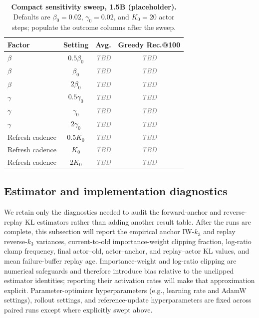 \documentclass{article}
\newcommand{\TBD}{\textcolor{gray}{\textit{TBD}}}
\begin{document}
\begin{table}[h]
\centering
\small
\begin{tabular}{lccc}
\toprule
Factor & Setting & Avg. & Greedy Rec.@100\\
\midrule
$\beta$ & $0.5\beta_0$ & \TBD & \TBD\\
$\beta$ & $\beta_0$ & \TBD & \TBD\\
$\beta$ & $2\beta_0$ & \TBD & \TBD\\
\midrule
$\gamma$ & $0.5\gamma_0$ & \TBD & \TBD\\
$\gamma$ & $\gamma_0$ & \TBD & \TBD\\
$\gamma$ & $2\gamma_0$ & \TBD & \TBD\\
\midrule
Refresh cadence & $0.5K_0$ & \TBD & \TBD\\
Refresh cadence & $K_0$ & \TBD & \TBD\\
Refresh cadence & $2K_0$ & \TBD & \TBD\\
\bottomrule
\end{tabular}
\caption{\textbf{Compact sensitivity sweep, 1.5B (placeholder).} Defaults are $\beta_0=0.02$, $\gamma_0=0.02$, and $K_0=20$ actor steps; populate the outcome columns after the sweep.}
\label{tab:sensitivity}
\end{table}

\subsection{Estimator and implementation diagnostics}
We retain only the diagnostics needed to audit the forward-anchor and reverse-replay KL estimators rather than adding another result table. After the runs are complete, this subsection will report the empirical anchor IW-$k_3$ and replay reverse-$k_3$ variances, current-to-old importance-weight clipping fraction, log-ratio clamp frequency, final actor--old, actor--anchor, and replay--actor KL values, and mean failure-buffer replay age. Importance-weight and log-ratio clipping are numerical safeguards and therefore introduce bias relative to the unclipped estimator identities; reporting their activation rates will make that approximation explicit. Parameter-optimizer hyperparameters (e.g., learning rate and AdamW settings), rollout settings, and reference-update hyperparameters are fixed across paired runs except where explicitly swept above.
\end{document}
